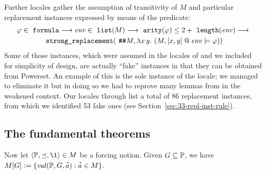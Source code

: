 Further locales gather the assumption of transitivity of $M$ and
particular replacement instances expressed by means of the
 predicate:
\begin{multline}\label{eq:replacement_assm_def}
\varphi \in \formula  \limp \mathit{env} \in \isatt{list}(M) \limp \isatt{arity}(\varphi) \leq 2+ \isatt{length}(\mathit{env}) \limp \\
 \isatt{strong{\uscore}replacement}(\isatt{\#\#} M, \lambda x\, y.\ (M, [x,y]
\mathbin{@} \mathit{env}  \models \varphi))
\end{multline}
Some of those instances, which were assumed in the locales of
 and we included for simplicity of design,
are actually “fake” instances in that they can be obtained from
Powerset. An example of this is the sole instance of the
 locale; we managed to eliminate it but in
doing so we had to reprove many lemmas from
 in the weakened context. Our locales
 through  list a total of 86
replacement instances, from which we identified 53 fake ones (see
Section~\ref{sec:33-repl-inst-rule}).

\subsection{The fundamental theorems}
Now let $\lb \PP, {\preceq} ,\1\rb \in M$ be a forcing notion. Given $G\subseteq \mathbb{P}$, we have
$M[G]\defi \{ \val(\PP,G,\punto{a}) : \punto{a}\in M \}$.

